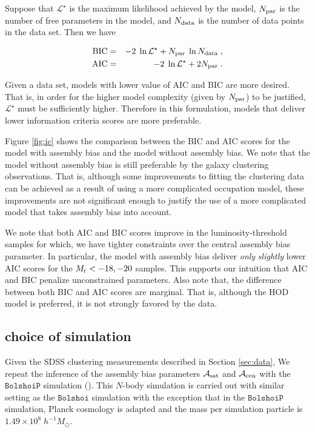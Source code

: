 \documentclass[12pt, preprint]{aastex}
\newcommand{\acen}{\mathcal{A}_{\rm cen}}
\newcommand{\asat}{\mathcal{A}_{\rm sat}}
\begin{document}
Suppose that $\mathcal{L}^{\star}$ is the maximum likelihood achieved by the model, $N_{\rm par}$ is the number of free parameters in the model, and $N_{\rm data}$ is the number of data points in the data set. Then we have

\begin{eqnarray}
\rm{BIC}&=& -2\;\ln \mathcal{L}^{\star} + N_{\rm par}\;\ln N_{\rm data} \; , \label{eq:bic} \\
\rm{AIC}&=& -2\;\ln \mathcal{L}^{\star} + 2N_{\rm par} \; . \label{eq:aic}
\end{eqnarray}

Given a data set, models with lower value of AIC and BIC are more desired. That is, in order for the higher model complexity (given by $N_{\rm par}$) to be justified, $\mathcal{L}^{\star}$ must be sufficiently higher. Therefore in this formulation, models that deliver lower information criteria scores are more preferable. 

Figure \ref{fig:ic} shows the comparison between the BIC and AIC scores for the model with assembly bias and the model without assembly bias. We note that the model without assembly bias is still preferable by the galaxy clustering observations. That is, although some improvements to fitting the clustering data can be achieved as a result of using a more complicated occupation model, these improvements are not significant enough to justify the use of a more complicated model that takes assembly bias into account. 

We note that both AIC and BIC scores improve in the luminosity-threshold samples for which, we have tighter constraints over the central assembly bias parameter. In particular, the model with assembly bias deliver \emph{only} \emph{slightly} lower AIC scores for the $M_{\rm r}<-18, -20$ samples. This supports our intuition that AIC and BIC penalize unconstrained parameters. Also note that, the difference between both BIC and AIC scores are marginal. That is, although the HOD model is preferred, it is not strongly favored by the data.

\subsection{choice of simulation}

Given the SDSS clustering measurements described in Section \ref{sec:data}, We repeat the inference of the assembly bias parameters $\asat$ and $\acen$ with the $\mathtt{BolshoiP}$ simulation (\citealt{bolshoi2016}). This $N$-body simulation is carried out with similar setting as the $\mathtt{Bolshoi}$ simulation with the exception that in the $\mathtt{BolshoiP}$ simulation, Planck cosmology is adapted and the mass per simulation particle is $1.49\times 10^8 \; h^{-1} M_{\odot}$. 
\end{document}
